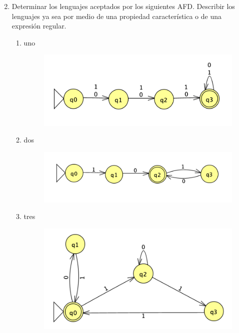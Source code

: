 \documentclass[
	12pt, %
]{fphw}
\begin{document}
\begin{enumerate}
  \setcounter{enumi}{1}
\item Determinar los lenguajes aceptados por los siguientes AFD. Describir los lenguajes ya sea por medio de una propiedad característica o de una expresión regular.
  \begin{enumerate}[i]
  \item uno\\
    \begin{figure}[H]
      \centering
      \includegraphics[width=\linewidth]{images/graph1.png}
    \end{figure}
  \item dos\\
    \begin{figure}[H]
      \centering
      \includegraphics[width=\linewidth]{images/graph2.png}
    \end{figure}
  \item tres\\
    \begin{figure}[H]
      \centering
      \includegraphics[width=\linewidth]{images/graph3.png}

\end{figure}
\end{enumerate}
\end{enumerate}
\end{document}
